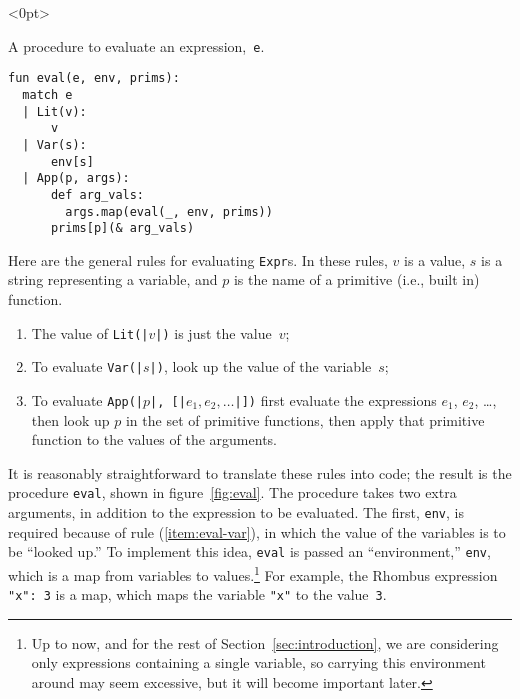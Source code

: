 \documentclass[11pt, a4paper]{article}
\newcommand{\cd}[1]{\texttt{#1}}
\begin{document}
\begin{marginfigure}<0pt>
  \caption[Eval procedure]{A procedure to evaluate an expression,~\cd{e}.\label{fig:eval}}
\footnotesize
\begin{verbatim}
fun eval(e, env, prims):
  match e
  | Lit(v):         
      v
  | Var(s):         
      env[s]
  | App(p, args):
      def arg_vals:
        args.map(eval(_, env, prims))
      prims[p](& arg_vals)
\end{verbatim}
\end{marginfigure}
Here are the general rules for evaluating \cd{Expr}s. In these rules,
$v$ is a value, $s$ is a string representing a variable, and $p$ is
the name of a primitive (i.e., built in) function.
\begin{enumerate}
\item The value of \cd{Lit(|$v$|)} is just the value~$v$;
\item To evaluate \cd{Var(|$s$|)}, look up the value of the
  variable~$s$;\label{item:eval-var}
\item To evaluate \cd{App(|$p$|, [|$e_1, e_2, \dotsc$|])} first
  evaluate the expressions $e_1$, $e_2$, \dots, then look up $p$ in
  the set of primitive functions, then apply that primitive function
  to the values of the arguments.\label{item:eval-app}
\end{enumerate}
It is reasonably straightforward to translate these rules into code;
the result is the procedure \cd{eval}, shown in
figure~\ref{fig:eval}. The procedure takes two extra arguments, in
addition to the expression to be evaluated. The first, \cd{env}, is
required because of rule (\ref{item:eval-var}), in which the value of
the variables is to be ``looked up.'' To implement this idea,
\cd{eval} is passed an ``environment,'' \cd{env}, which is a map from
variables to values.\footnote{Up to now, and for the rest of
  Section~\ref{sec:introduction}, we are considering only expressions
  containing a single variable, so carrying this environment around
  may seem excessive, but it will become important later.} For
example, the Rhombus expression \cd{{"x": 3}} is a map, which maps the
variable \cd{"x"} to the value~\cd{3}.
\end{document}
